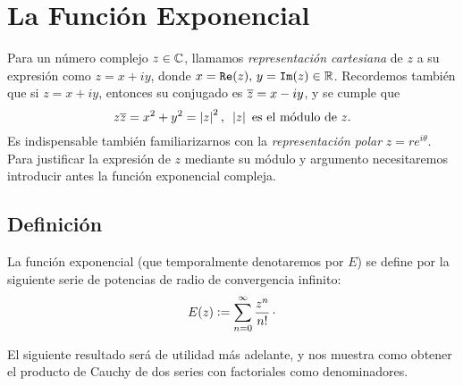 \section{La Función Exponencial}
  Para un número complejo $z\in \mathbb{C}$, llamamos {\it representación cartesiana} de $z$ a 
  su expresión como $z = x + iy$, donde $x = \mathtt{Re}(z),\, y =\mathtt{Im}(z)\in \mathbb{R}$. Recordemos
  también que si $z = x + iy$, entonces su conjugado es $\overline{z} = x - iy$, y se cumple 
  que 
  \[ 
  z \overline{z} = x^2 + y^2 = \left\lvert z\right\rvert^2, \,\,\, \left\lvert z\right\rvert \text{ es el módulo de } z.
  \]
  Es indispensable también familiarizarnos con la {\it representación polar} $z = re^{i\theta}$.
  Para justificar la expresión de $z$ mediante su módulo y argumento necesitaremos introducir 
  antes la función exponencial compleja.

  \subsection{Definición}
  \begin{defi}
    La función exponencial (que temporalmente denotaremos por $E$) se define por la siguiente serie de
    potencias de radio de convergencia infinito:
    \begin{equation}\label{exp_def}
      E(z) \vcentcolon = \displaystyle \sum_{n=0}^{\infty} \frac{z^n}{n!} \, \cdot
    \end{equation}
  \end{defi}
  El siguiente resultado será de utilidad más adelante, y nos muestra como obtener el producto de Cauchy 
  de dos series con factoriales como denominadores.

